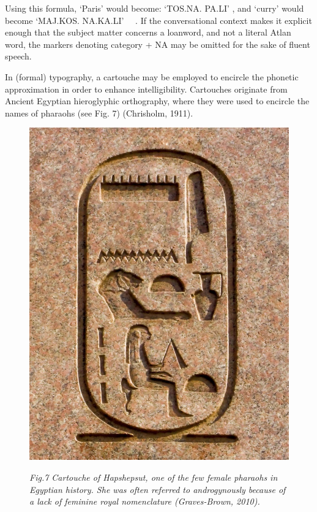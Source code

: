 Using this formula, ‘Paris’ would become: ‘TOS.NA. PA.LI’ \tos\na \cartouche{\pa \li}, and ‘curry’ would become ‘MAJ.KOS. NA.KA.LI’ \maj\kos\ \ \na \cartouche{\ka \li}. If the conversational context makes it explicit enough that the subject matter concerns a loanword, and not a literal Atlan word, the markers denoting category + NA may be omitted for the sake of fluent speech.  

In (formal) typography, a cartouche may be employed to encircle the phonetic approximation in order to enhance intelligibility. Cartouches originate from Ancient Egyptian hieroglyphic orthography, where they were used to encircle the names of pharaohs (see Fig. 7) (Chrisholm, 1911).  

\begin{figure}
\includegraphics[scale=0.1]{./Images/Cartouche.jpeg}

	{\footnotesize \it Fig.7 Cartouche of Hapshepsut, one of the few female pharaohs in Egyptian history. She was often referred to androgynously because of a lack of feminine royal nomenclature (Graves-Brown, 2010). }

\end{figure}
 

